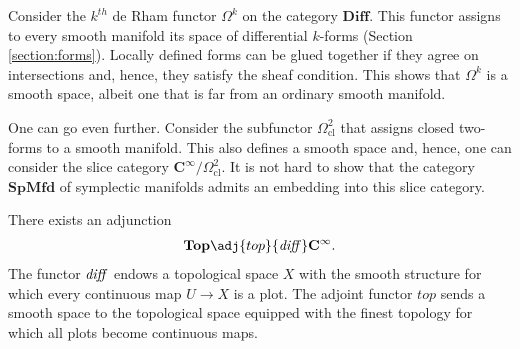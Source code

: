     \begin{example}
        Consider the $k^{th}$ de Rham functor $\Omega^k$ on the category $\mathbf{Diff}$. This functor assigns to every smooth manifold its space of differential $k$-forms (Section \ref{section:forms}). Locally defined forms can be glued together if they agree on intersections and, hence, they satisfy the sheaf condition. This shows that $\Omega^k$ is a smooth space, albeit one that is far from an ordinary smooth manifold.

        One can go even further. Consider the subfunctor $\Omega^2_\mathrm{cl}$ that assigns closed two-forms to a smooth manifold. This also defines a smooth space and, hence, one can consider the slice category $\mathbf{C^\infty}/\Omega^2_\mathrm{cl}$. It is not hard to show that the category $\mathbf{SpMfd}$ of symplectic manifolds admits an embedding into this slice category.
    \end{example}

    \begin{property}
        There exists an adjunction
        \begin{gather}
            \mathbf{Top}\adj{top}{\text{\textit{diff}}}\mathbf{C^\infty}.
        \end{gather}
        The functor $\text{\textit{diff}}$ endows a topological space $X$ with the smooth structure for which every continuous map $U\rightarrow X$ is a plot. The adjoint functor $top$ sends a smooth space to the topological space equipped with the finest topology for which all plots become continuous maps.
    \end{property}

